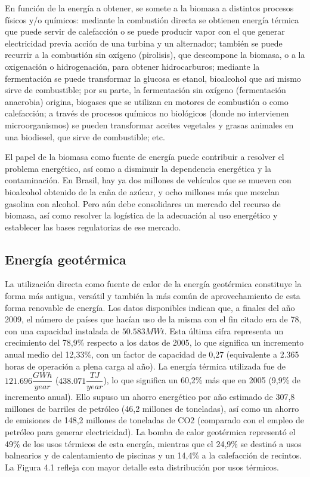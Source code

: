\documentclass[12pt,letterpaper,superscriptaddress]{article}
\begin{document}
En función de la energía a obtener, se somete a la biomasa a distintos procesos físicos y/o químicos: mediante la combustión directa se obtienen energía térmica que puede servir de calefacción o se puede producir vapor con el que generar electricidad previa acción de una turbina y un alternador; también se puede recurrir a la combustión sin oxígeno (pirolisis), que descompone la biomasa, o a la oxigenación o hidrogenación, para obtener hidrocarburos; mediante la fermentación se puede transformar la glucosa es etanol, bioalcohol que así mismo sirve de combustible; por su parte, la fermentación sin oxígeno (fermentación anaerobia) origina, biogases que se utilizan en motores de combustión o como calefacción; a través de procesos químicos no biológicos (donde no intervienen microorganismos) se pueden transformar aceites vegetales y grasas animales en una biodiesel, que sirve de combustible; etc.

El papel de la biomasa como fuente de energía puede contribuir a resolver el problema energético, así como a disminuir la dependencia energética y la contaminación. En Brasil, hay ya dos millones de vehículos que se mueven con bioalcohol obtenido de la caña de azúcar, y ocho millones más que mezclan gasolina con alcohol. Pero aún debe consolidares un mercado del recurso de biomasa, así como resolver la logística de la adecuación al uso energético y establecer las bases regulatorias de ese mercado.

\subsection{Energía geotérmica}

La utilización directa como fuente de calor de la energía geotérmica constituye la forma más antigua, versátil y también la más común de aprovechamiento de esta forma renovable de energía. Los datos disponibles indican que, a finales del año 2009, el número de países que hacían uso de la misma con el fin citado era de 78, con una capacidad instalada de $50.583 MWt$. Esta última cifra representa un crecimiento del 78,9\% respecto a los datos de 2005, lo que significa un incremento anual medio del 12,33\%, con un factor de capacidad de 0,27 (equivalente a 2.365 horas de operación a plena carga al año). La energía térmica utilizada fue de $121.696 \dfrac{GWh}{year}$ ($438.071 \dfrac{TJ}{year}$), lo que significa un 60,2\% más que en 2005 (9,9\% de incremento anual). Ello supuso un ahorro energético por año estimado de 307,8 millones de barriles de petróleo (46,2 millones de toneladas), así como un ahorro de emisiones de 148,2 millones de toneladas de CO2 (comparado con el empleo de petróleo para generar electricidad). La bomba de calor geotérmica representó el 49\% de los usos térmicos de esta energía, mientras que el 24,9\% se destinó a usos balnearios y de calentamiento de piscinas y un 14,4\% a la calefacción de recintos. La Figura 4.1 refleja con mayor detalle esta distribución por usos térmicos. 
\end{document}

